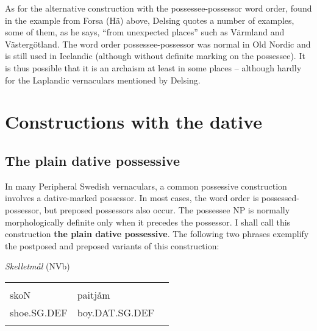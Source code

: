 \begin{styleBodytextC}
As for the alternative construction with the possessee-possessor word order, found in the example from Forsa (Hä) above, Delsing quotes a number of examples, some of them, as he says, “from unexpected places” such as Värmland and Västergötland. The word order possessee-possessor was normal in Old Nordic and is still used in Icelandic (although without definite marking on the possessee). It is thus possible that it is an archaism at least in some places – although hardly for the Laplandic vernaculars mentioned by Delsing.

\end{styleBodytextC}

\section{Constructions with the dative}
\label{bkm:Ref136427895}\subsection{\rmfamily The plain dative possessive}

\begin{styleBodyTextFirst}
In many Peripheral Swedish vernaculars, a common possessive construction involves a dative-marked possessor. In most cases, the word order is possessed-possessor, but preposed possessors also occur. The possessee NP is normally morphologically definite only when it precedes the possessor. I shall call this construction \textbf{the plain dative possessive}. The following two phrases exemplify the postposed and preposed variants of this construction:

\end{styleBodyTextFirst}

\begin{listWWNumileveli}
\item {}

\begin{styleExample}
\textit{Skelletmål} (NVb)

\end{styleExample}

\end{listWWNumileveli}

\begin{tabular}{lll}
\lsptoprule
\multicolumn{3}{l}{{\bfseries\scshape possessee}

}\\
skoN & paitjåm & \\
shoe.SG.DEF & boy.DAT.SG.DEF & \\
\lspbottomrule
\end{tabular}

